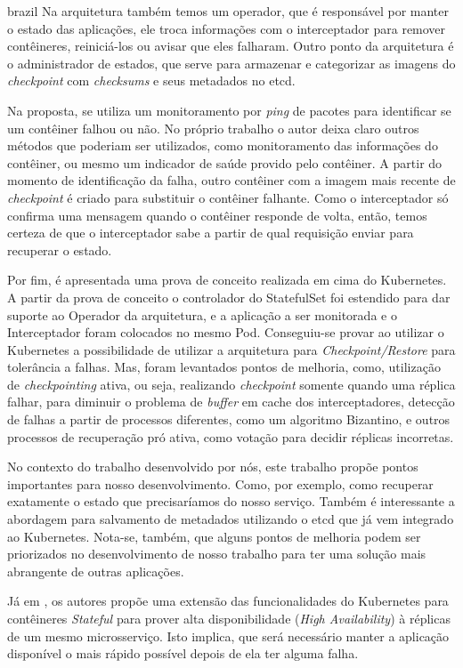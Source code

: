 \begin{otherlanguage*}{brazil}
Na arquitetura também temos um operador, que é responsável por manter o
estado das aplicações, ele troca informações com o interceptador para remover
contêineres, reiniciá-los ou avisar que eles falharam. Outro ponto da
arquitetura é o administrador de estados, que serve para armazenar e categorizar
as imagens do \textit{checkpoint} com \textit{checksums} e seus metadados no etcd.

Na proposta, se utiliza um monitoramento por \textit{ping} de pacotes para
identificar se um contêiner falhou ou não. No próprio trabalho o autor deixa
claro outros métodos que poderiam ser utilizados, como monitoramento das
informações do contêiner, ou mesmo um indicador de saúde provido pelo contêiner.
A partir do momento de identificação da falha, outro contêiner com a imagem
mais recente de \textit{checkpoint} é criado para substituir o contêiner
falhante. Como o interceptador só confirma uma mensagem quando o contêiner
responde de volta, então, temos certeza de que o interceptador sabe a partir
de qual requisição enviar para recuperar o estado.

Por fim, é apresentada uma prova de conceito realizada em cima do Kubernetes.
A partir da prova de conceito o controlador do StatefulSet foi estendido para
dar suporte ao Operador da arquitetura, e a aplicação a ser monitorada e o
Interceptador foram colocados no mesmo Pod. Conseguiu-se provar ao utilizar o
Kubernetes a possibilidade de utilizar a arquitetura para
\textit{Checkpoint/Restore} para tolerância a falhas. Mas, foram levantados
pontos de melhoria, como, utilização de \textit{checkpointing} ativa, ou seja,
realizando \textit{checkpoint} somente quando uma réplica falhar, para diminuir
o problema de \textit{buffer} em cache dos interceptadores, detecção de falhas
a partir de processos diferentes, como um algoritmo Bizantino, e outros
processos de recuperação pró ativa, como votação para decidir réplicas incorretas.

No contexto do trabalho desenvolvido por nós, este trabalho propõe pontos
importantes para nosso desenvolvimento. Como, por exemplo, como recuperar
exatamente o estado que precisaríamos do nosso serviço. Também é interessante
a abordagem para salvamento de metadados utilizando o etcd que já vem integrado
ao Kubernetes. Nota-se, também, que alguns pontos de melhoria podem ser
priorizados no desenvolvimento de nosso trabalho para ter uma solução mais
abrangente de outras aplicações.

Já em \cite{vayghan2021kubernetes}, os autores propõe uma extensão das
funcionalidades do Kubernetes para contêineres \textit{Stateful} para
prover alta disponibilidade (\textit{High Availability}) à réplicas de um mesmo
microsserviço. Isto implica, que será necessário manter a aplicação disponível
o mais rápido possível depois de ela ter alguma falha.


\end{otherlanguage*}
